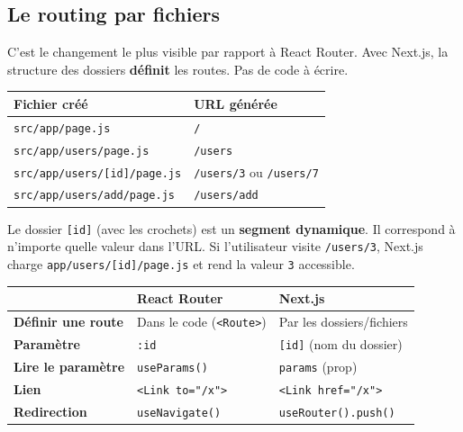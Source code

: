 \documentclass[11pt,a4paper]{article}
\begin{document}
\subsection{Le routing par fichiers}

C'est le changement le plus visible par rapport à React Router. Avec Next.js, la structure des dossiers \textbf{définit} les routes. Pas de code à écrire.

\begin{retenirbox}[La structure des dossiers = les URL]
\begin{center}
\begin{tabular}{ll}
\toprule
\textbf{Fichier créé} & \textbf{URL générée} \\
\midrule
\texttt{src/app/page.js} & \texttt{/} \\
\texttt{src/app/users/page.js} & \texttt{/users} \\
\texttt{src/app/users/[id]/page.js} & \texttt{/users/3} ou \texttt{/users/7} \\
\texttt{src/app/users/add/page.js} & \texttt{/users/add} \\
\bottomrule
\end{tabular}
\end{center}

Le dossier \texttt{[id]} (avec les crochets) est un \textbf{segment dynamique}. Il correspond à n'importe quelle valeur dans l'URL. Si l'utilisateur visite \texttt{/users/3}, Next.js charge \texttt{app/users/[id]/page.js} et rend la valeur \texttt{3} accessible.
\end{retenirbox}

\begin{retenirbox}
\begin{center}
\begin{tabular}{lp{4.2cm}p{4.2cm}}
\toprule
& \textbf{React Router} & \textbf{Next.js} \\
\midrule
\textbf{Définir une route} & Dans le code (\texttt{<Route>}) & Par les dossiers/fichiers \\
\textbf{Paramètre} & \texttt{:id} & \texttt{[id]} (nom du dossier) \\
\textbf{Lire le paramètre} & \texttt{useParams()} & \texttt{params} (prop) \\
\textbf{Lien} & \texttt{<Link to="/x">} & \texttt{<Link href="/x">} \\
\textbf{Redirection} & \texttt{useNavigate()} & \texttt{useRouter().push()} \\
\bottomrule
\end{tabular}
\end{center}
\end{retenirbox}
\end{document}
